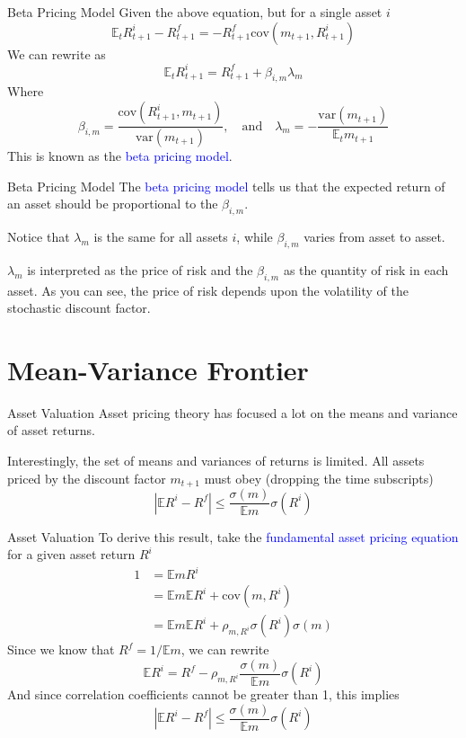 \documentclass[aspectratio=169,xcolor=dvipsnames]{beamer}
\begin{document}
\begin{frame}{Beta Pricing Model}
    Given the above equation, but for a single asset $i$
    \[
        \mathbb{E}_t R^i_{t+1} - R^f_{t+1} = -R^f_{t+1} \mathrm{cov}(m_{t+1}, R^i_{t+1})
    \]
    We can rewrite as
    \[
        \mathbb{E}_t R^i_{t+1} = R^f_{t+1} + \beta_{i,m} \lambda_m
    \]
    Where
    \[
        \beta_{i,m} = \frac{\mathrm{cov}(R^i_{t+1}, m_{t+1})}{\mathrm{var}(m_{t+1})}, \quad \text{and} \quad \lambda_m = -\frac{\mathrm{var}(m_{t+1})}{\mathbb{E}_t m_{t+1}}
    \]
    This is known as the \textcolor{blue}{beta pricing model}.
\end{frame}

\begin{frame}{Beta Pricing Model}
    The \textcolor{blue}{beta pricing model} tells us that the expected return of an asset should be proportional to the $\beta_{i,m}$.

    Notice that $\lambda_m$ is the same for all assets $i$, while $\beta_{i,m}$ varies from asset to asset.

    $\lambda_m$ is interpreted as the price of risk and the $\beta_{i,m}$ as the quantity of risk in each asset. As you can see, the price of risk depends upon the volatility of the stochastic discount factor.
\end{frame}

\section{Mean-Variance Frontier}

\begin{frame}{Asset Valuation}
    Asset pricing theory has focused a lot on the means and variance of asset returns.

    Interestingly, the set of means and variances of returns is limited. All assets priced by the discount factor $m_{t+1}$ must obey (dropping the time subscripts)
    \[
        \left| \mathbb{E} R^i - R^f \right| \le \frac{\sigma(m)}{\mathbb{E} m} \sigma(R^i)
    \]
\end{frame}

\begin{frame}{Asset Valuation}
    To derive this result, take the \textcolor{blue}{fundamental asset pricing equation} for a given asset return $R^i$
    \begin{align*}
        1 &= \mathbb{E} m R^i \\
          &= \mathbb{E} m \mathbb{E} R^i + \mathrm{cov}(m, R^i) \\
          &= \mathbb{E} m \mathbb{E} R^i + \rho_{m, R^i} \sigma(R^i) \sigma(m)
    \end{align*}
    Since we know that $R^f = 1/\mathbb{E} m$, we can rewrite
    \[
        \mathbb{E} R^i = R^f - \rho_{m, R^i} \frac{\sigma(m)}{\mathbb{E} m} \sigma(R^i)
    \]
    And since correlation coefficients cannot be greater than 1, this implies
    \[
        \left| \mathbb{E} R^i - R^f \right| \le \frac{\sigma(m)}{\mathbb{E} m} \sigma(R^i)
    \]
\end{frame}
\end{document}
